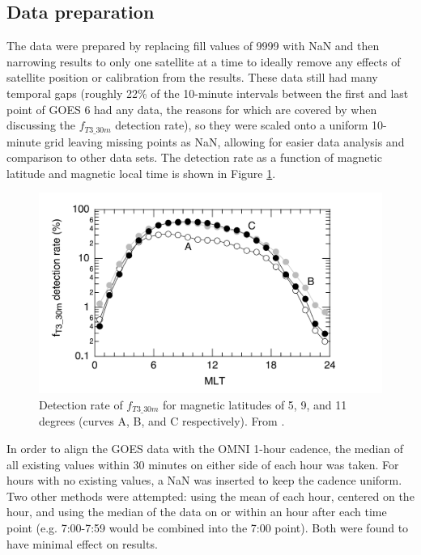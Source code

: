\subsection{Data preparation}
The data were prepared by replacing fill values of 9999 with NaN and then narrowing results to only one satellite at a time to ideally remove any effects of satellite position or calibration from the results. These data still had many temporal gaps (roughly 22\% of the 10-minute intervals between the first and last point of GOES 6 had any data, the reasons for which are covered by \cite{Takahashi2010SolarCycleVariation} when discussing the $f_{T3\_30m}$ detection rate), so they were scaled onto a uniform 10-minute grid leaving missing points as NaN, allowing for easier data analysis and comparison to other data sets. The detection rate as a function of magnetic latitude and magnetic local time is shown in Figure \ref{fig:Takahashi2010Availability}.

\begin{figure}[htp!]
	\centering
	\includegraphics[width=0.8\linewidth]{Figures/Takahashi2010Availability.png}
	\caption{Detection rate of $f_{T3\_30m}$ for magnetic latitudes of 5, 9, and 11 degrees (curves A, B, and C respectively). From \citep{Takahashi2010SolarCycleVariation}.}
	\label{fig:Takahashi2010Availability}
\end{figure}


In order to align the GOES data with the OMNI 1-hour cadence, the median of all existing values within 30 minutes on either side of each hour was taken. For hours with no existing values, a NaN was inserted to keep the cadence uniform. Two other methods were attempted: using the mean of each hour, centered on the hour, and using the median of the data on or within an hour after each time point (e.g. 7:00-7:59 would be combined into the 7:00 point). Both were found to have minimal effect on results.

